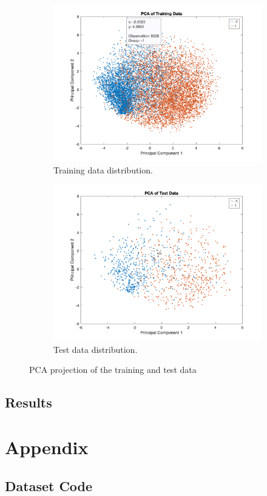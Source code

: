 \documentclass{article}
\begin{document}
\begin{figure}[H]
  \centering
  \begin{subfigure}[b]{0.45\textwidth}
    \centering
    \includegraphics[width=\textwidth]{images/train_data.png}
    \caption{Training data distribution.}
    \label{fig:train_data}
  \end{subfigure}
  \begin{subfigure}[b]{0.45\textwidth}
    \centering
    \includegraphics[width=\textwidth]{images/test_data.png}
    \caption{Test data distribution.}
    \label{fig:test_data}
  \end{subfigure}
  \caption{PCA projection of the training and test data}
  \label{fig:side_by_side_images}
\end{figure}


\subsection*{Results}


\newpage
\section*{Appendix}
\subsection*{Dataset Code}


\end{document}
